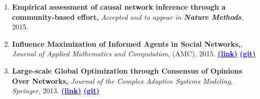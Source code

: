 \documentclass[letter]{res}
\begin{document}
\begin{resume}
\begin{enumerate}[leftmargin=-.01in]
\item \textbf{Empirical assessment of causal network inference through a community-based effort,} \textit{Accepted and to appear in \textbf{Nature Methods}}, 2015.

\item \textbf{Influence Maximization of Informed Agents in Social Networks,}, \textit{Journal of Applied Mathematics and Computation}, (AMC), 2015.
{\href{http://dx.doi.org/10.1016/j.amc.2014.12.139}{\textbf{\textcolor{blue}{(link)}}}}
{\href{https://github.com/omid55/influence_maximization}{\textbf{\textcolor{blue}{(git)}}}}

\item \textbf{Large-scale Global Optimization through Consensus of Opinions Over Networks,} \textit{Journal of the Complex Adaptive Systems Modeling}, \textit{Springer}, 2013.
{\href{http://www.casmodeling.com/content/1/1/11}{\textbf{\textcolor{blue}{(link)}}}}
{\href{https://github.com/omid55/optimization_opinion_formation}{\textbf{\textcolor{blue}{(git)}}}}


\end{enumerate}
\end{resume}
\end{document}
